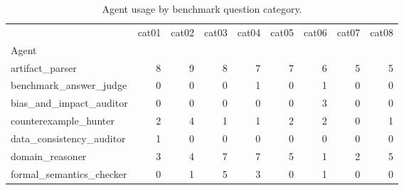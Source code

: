 \begin{table}
\caption{Agent usage by benchmark question category.}
\label{tab:agent-usage-by-category}
\begin{tabular}{lrrrrrrrr}
\toprule
 & cat01 & cat02 & cat03 & cat04 & cat05 & cat06 & cat07 & cat08 \\
Agent &  &  &  &  &  &  &  &  \\
\midrule
artifact\_parser & 8 & 9 & 8 & 7 & 7 & 6 & 5 & 5 \\
benchmark\_answer\_judge & 0 & 0 & 0 & 1 & 0 & 1 & 0 & 0 \\
bias\_and\_impact\_auditor & 0 & 0 & 0 & 0 & 0 & 3 & 0 & 0 \\
counterexample\_hunter & 2 & 4 & 1 & 1 & 2 & 2 & 0 & 1 \\
data\_consistency\_auditor & 1 & 0 & 0 & 0 & 0 & 0 & 0 & 0 \\
domain\_reasoner & 3 & 4 & 7 & 7 & 5 & 1 & 2 & 5 \\
formal\_semantics\_checker & 0 & 1 & 5 & 3 & 0 & 1 & 0 & 0 \\
\bottomrule
\end{tabular}
\end{table}
